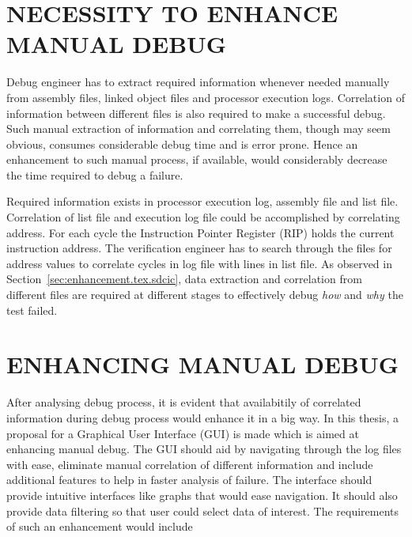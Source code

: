 \section {NECESSITY TO ENHANCE MANUAL DEBUG}
\label{sec:enhancement.tex.nemv}

Debug engineer has to extract required information whenever needed manually from assembly files, linked object files and processor execution logs. Correlation of information between different files is also required to make a successful debug. Such manual extraction of information and correlating them, though may seem obvious, consumes considerable debug time and is error prone. Hence an enhancement to such manual process, if available, would considerably decrease the time required to debug a failure.

Required information exists in processor execution log, assembly file and list file. Correlation of list file and execution log file could be accomplished by correlating address. For each cycle the Instruction Pointer Register (RIP) holds the current instruction address. The verification engineer has to search through the files for address values to correlate cycles in log file with lines in list file. As observed in Section~\ref{sec:enhancement.tex.sdcic}, data extraction and correlation from different files are required at different stages to effectively debug {\it how} and {\it why} the test failed.

\section {ENHANCING MANUAL DEBUG}
\label{sec:enhancement.tex.emv}

After analysing debug process, it is evident that availabitily of correlated information during debug process would enhance it in a big way.  In this thesis, a proposal for a Graphical User Interface (GUI) is made which is aimed at enhancing manual debug. The GUI should aid by navigating through the log files with ease, eliminate manual correlation of different information and include additional features to help in faster analysis of failure. The interface should provide intuitive interfaces like graphs that would ease navigation. It should also provide data filtering so that user could select data of interest. The requirements of such an enhancement would include


